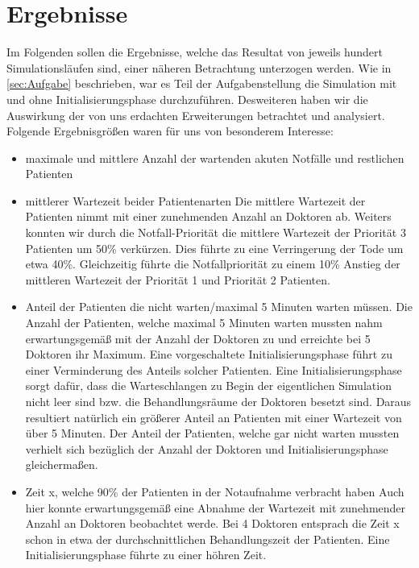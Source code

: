 \documentclass[12pt,fleqn,a4paper]{article}
\begin{document}
\newpage

\section{Ergebnisse}
Im Folgenden sollen die Ergebnisse, welche das Resultat von jeweils hundert Simulationsl\"{a}ufen sind, einer n\"{a}heren Betrachtung unterzogen werden.
Wie in \ref{sec:Aufgabe} beschrieben, war es Teil der Aufgabenstellung die Simulation mit und ohne Initialisierungsphase durchzuf\"{u}hren.
Desweiteren haben wir die Auswirkung  der von uns erdachten Erweiterungen betrachtet und analysiert.
Folgende Ergebnisgr\"{o}{\ss}en waren f\"{u}r uns von besonderem Interesse:
\begin{itemize}
	\item maximale und mittlere Anzahl der wartenden akuten 	Notf\"{a}lle und restlichen Patienten 
	\item mittlerer Wartezeit beider Patientenarten\newline
	Die mittlere Wartezeit der Patienten nimmt mit einer zunehmenden Anzahl an Doktoren ab.
	Weiters konnten wir durch die Notfall-Priorit\"{a}t die mittlere Wartezeit der Priorit\"{a}t 3 Patienten um 50\% verk\"{u}rzen. Dies f\"{u}hrte zu eine
	Verringerung der Tode um etwa 40\%. Gleichzeitig f\"{u}hrte die Notfallpriorit\"{a}t zu einem 10\% Anstieg der mittleren Wartezeit der Priorit\"{a}t 1 und Priorit\"{a}t 2 Patienten. 
	\item Anteil der Patienten die nicht warten/maximal 5 Minuten warten m\"{u}ssen.\newline
	Die Anzahl der Patienten, welche maximal 5 Minuten warten mussten nahm erwartungsgem\"{a}{\ss} mit der Anzahl der Doktoren zu und erreichte bei 5 Doktoren ihr Maximum. Eine vorgeschaltete Initialisierungsphase f\"{u}hrt zu einer Verminderung des Anteils solcher Patienten.
Eine Initialisierungsphase sorgt daf\"{u}r, dass die Warteschlangen zu Begin der eigentlichen Simulation nicht leer sind bzw.
 die Behandlungsr\"{a}ume der Doktoren besetzt sind. Daraus resultiert nat\"{u}rlich ein gr\"{o}{\ss}erer Anteil an Patienten mit einer Wartezeit von \"{u}ber 5 Minuten. 
	Der Anteil der Patienten, welche gar nicht warten mussten verhielt sich bez\"{u}glich der Anzahl der Doktoren und Initialisierungsphase gleicherma{\ss}en.

	\item Zeit x, welche 90\% der Patienten in der Notaufnahme verbracht haben
	Auch hier konnte erwartungsgem\"{a}{\ss} eine Abnahme der Wartezeit mit zunehmender Anzahl an Doktoren beobachtet werde. Bei 4 Doktoren entsprach die Zeit x schon in etwa der durchschnittlichen Behandlungszeit der Patienten. 
Eine Initialisierungsphase f\"{u}hrte zu einer h\"{o}hren Zeit.
\end{itemize}
\end{document}
